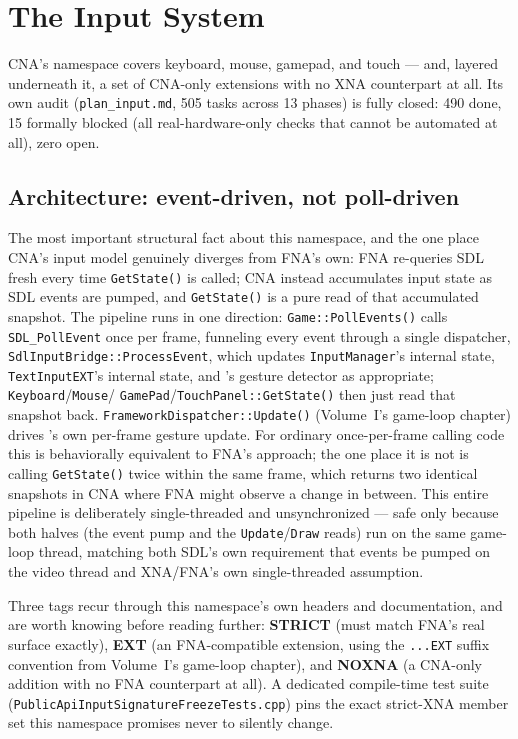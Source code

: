 \chapter{The Input System}
\label{ch:input-system}

CNA's  namespace covers keyboard, mouse, gamepad,
and touch --- and, layered underneath it, a set of CNA-only extensions with no XNA
counterpart at all. Its own audit (\texttt{plan\_input.md}, 505 tasks across 13 phases) is
fully closed: 490 done, 15 formally blocked (all real-hardware-only checks that cannot be
automated at all), zero open.

\section{Architecture: event-driven, not poll-driven}

The most important structural fact about this namespace, and the one place CNA's input
model genuinely diverges from FNA's own: FNA re-queries SDL fresh every time
\texttt{GetState()} is called; CNA instead accumulates input state as SDL events are pumped,
and \texttt{GetState()} is a pure read of that accumulated snapshot. The pipeline runs in one
direction: \texttt{Game::PollEvents()} calls \texttt{SDL\_PollEvent} once per frame, funneling
every event through a single dispatcher, \texttt{SdlInputBridge::ProcessEvent}, which updates
\texttt{InputManager}'s internal state, \texttt{TextInputEXT}'s internal state, and
's gesture detector as appropriate; \texttt{Keyboard}/\texttt{Mouse}/%
\texttt{GamePad}/\texttt{TouchPanel::GetState()} then just read that snapshot back.
\texttt{FrameworkDispatcher::Update()} (Volume~I's game-loop chapter) drives
's own per-frame gesture update. For ordinary once-per-frame calling
code this is behaviorally equivalent to FNA's approach; the one place it is not is calling
\texttt{GetState()} twice within the same frame, which returns two identical snapshots in
CNA where FNA might observe a change in between. This entire pipeline is deliberately
single-threaded and unsynchronized --- safe only because both halves (the event pump and the
\texttt{Update}/\texttt{Draw} reads) run on the same game-loop thread, matching both SDL's own
requirement that events be pumped on the video thread and XNA/FNA's own single-threaded
assumption.

Three tags recur through this namespace's own headers and documentation, and are worth
knowing before reading further: \textbf{STRICT} (must match FNA's real surface exactly),
\textbf{EXT} (an FNA-compatible extension, using the \texttt{...EXT} suffix convention from
Volume~I's game-loop chapter), and \textbf{NOXNA} (a CNA-only addition with no FNA counterpart
at all). A dedicated compile-time test suite (\texttt{PublicApiInputSignatureFreezeTests.cpp})
pins the exact strict-XNA member set this namespace promises never to silently change.

